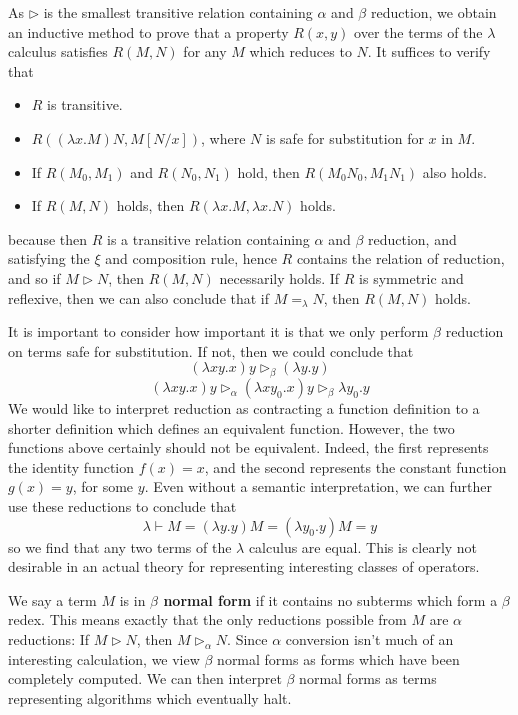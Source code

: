 As $\rhd$ is the smallest transitive relation containing $\alpha$ and $\beta$ reduction, we obtain an inductive method to prove that a property $R(x,y)$ over the terms of the $\lambda$ calculus satisfies $R(M,N)$ for any $M$ which reduces to $N$. It suffices to verify that
%
\begin{itemize}
    \item $R$ is transitive.
    \item $R((\lambda x.M)N, M[N/x])$, where $N$ is safe for substitution for $x$ in $M$.
    \item If $R(M_0, M_1)$ and $R(N_0, N_1)$ hold, then $R(M_0 N_0, M_1 N_1)$ also holds.
    \item If $R(M,N)$ holds, then $R(\lambda x.M, \lambda x.N)$ holds.
\end{itemize}
%
because then $R$ is a transitive relation containing $\alpha$ and $\beta$ reduction, and satisfying the $\xi$ and composition rule, hence $R$ contains the relation of reduction, and so if $M \rhd N$, then $R(M,N)$ necessarily holds. If $R$ is symmetric and reflexive, then we can also conclude that if $M =_\lambda N$, then $R(M,N)$ holds.

It is important to consider how important it is that we only perform $\beta$ reduction on terms safe for substitution. If not, then we could conclude that
%
\[ (\lambda xy.x)y \rhd_\beta (\lambda y.y) \]
%
\[ (\lambda xy.x)y \rhd_\alpha (\lambda xy_0.x)y \rhd_\beta \lambda y_0.y \]
%
We would like to interpret reduction as contracting a function definition to a shorter definition which defines an equivalent function. However, the two functions above certainly should not be equivalent. Indeed, the first represents the identity function $f(x) = x$, and the second represents the constant function $g(x) = y$, for some $y$. Even without a semantic interpretation, we can further use these reductions to conclude that
%
\[ \lambda \vdash M = (\lambda y.y)M = (\lambda y_0.y)M = y \]
%
so we find that any two terms of the $\lambda$ calculus are equal. This is clearly not desirable in an actual theory for representing interesting classes of operators.

We say a term $M$ is in {\bf $\beta$ normal form} if it contains no subterms which form a $\beta$ redex. This means exactly that the only reductions possible from $M$ are $\alpha$ reductions: If $M \rhd N$, then $M \rhd_\alpha N$. Since $\alpha$ conversion isn't much of an interesting calculation, we view $\beta$ normal forms as forms which have been completely computed. We can then interpret $\beta$ normal forms as terms representing algorithms which eventually halt.

